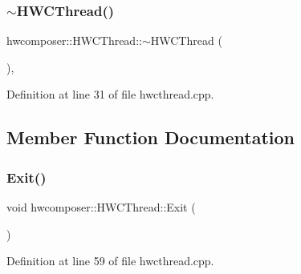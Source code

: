 \subsubsection{\texorpdfstring{$\sim$\+H\+W\+C\+Thread()}{~HWCThread()}}
{\footnotesize\ttfamily hwcomposer\+::\+H\+W\+C\+Thread\+::$\sim$\+H\+W\+C\+Thread (\begin{DoxyParamCaption}{ }\end{DoxyParamCaption})\hspace{0.3cm}{\ttfamily [protected]}, {\ttfamily [virtual]}}



Definition at line 31 of file hwcthread.\+cpp.


\begin{DoxyCode}{0}
\end{DoxyCode}


\subsection{Member Function Documentation}
\mbox{\label{classhwcomposer_1_1HWCThread_aa360360e4c27cbc7fed745f79990a190}} 
\subsubsection{\texorpdfstring{Exit()}{Exit()}}
{\footnotesize\ttfamily void hwcomposer\+::\+H\+W\+C\+Thread\+::\+Exit (\begin{DoxyParamCaption}{ }\end{DoxyParamCaption})\hspace{0.3cm}{\ttfamily [protected]}}



Definition at line 59 of file hwcthread.\+cpp.


